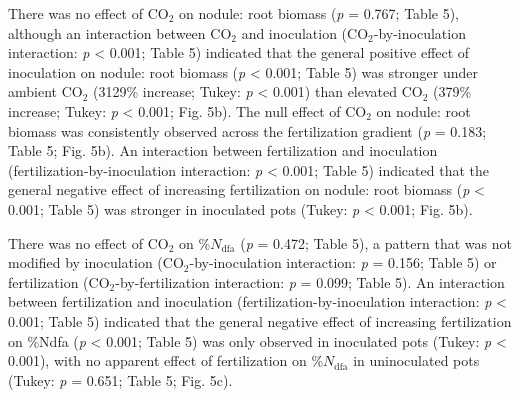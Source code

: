 There was no effect of CO$_2$ on nodule: root biomass (\textit{p} = 0.767; Table 5), although an interaction between CO$_2$ and inoculation (CO$_2$-by-inoculation interaction: \textit{p} < 0.001; Table 5) indicated that the general positive effect of inoculation on nodule: root biomass (\textit{p} < 0.001; Table 5) was stronger under ambient CO$_2$ (3129\% increase; Tukey: \textit{p} < 0.001) than elevated CO$_2$ (379\% increase; Tukey: \textit{p} < 0.001; Fig. 5b). The null effect of CO$_2$ on nodule: root biomass was consistently observed across the fertilization gradient (\textit{p} = 0.183; Table 5; Fig. 5b). An interaction between fertilization and inoculation (fertilization-by-inoculation interaction: \textit{p} < 0.001; Table 5) indicated that the general negative effect of increasing fertilization on nodule: root biomass (\textit{p} < 0.001; Table 5) was stronger in inoculated pots (Tukey: \textit{p} < 0.001; Fig. 5b). 

There was no effect of CO$_2$ on \%$N_\mathrm{dfa}$ (\textit{p} = 0.472; Table 5), a pattern that was not modified by inoculation (CO$_2$-by-inoculation interaction: \textit{p} = 0.156; Table 5) or fertilization (CO$_2$-by-fertilization interaction: \textit{p} = 0.099; Table 5). An interaction between fertilization and inoculation (fertilization-by-inoculation interaction: \textit{p} < 0.001; Table 5) indicated that the general negative effect of increasing fertilization on \%Ndfa (\textit{p} < 0.001; Table 5) was only observed in inoculated pots (Tukey: \textit{p} < 0.001), with no apparent effect of fertilization on \%$N_\mathrm{dfa}$ in uninoculated pots (Tukey: \textit{p} = 0.651; Table 5; Fig. 5c).

